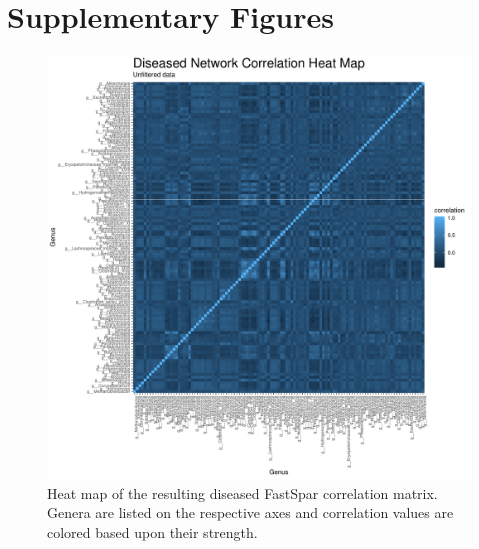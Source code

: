 \chapter{Supplementary Figures}

\begin{figure}[htb!]
    \centering
    \includegraphics[width=1.0\linewidth]{figure/results/diseased_raw_corr_heatmap.pdf}
    \caption[Heat map of the resulting diseased FastSpar correlation matrix.]{Heat map of the resulting diseased FastSpar correlation matrix. Genera are listed on the respective axes and correlation values are colored based upon their strength. }
    \label{apdx-fig-d-orig-heatmap}
\end{figure}

